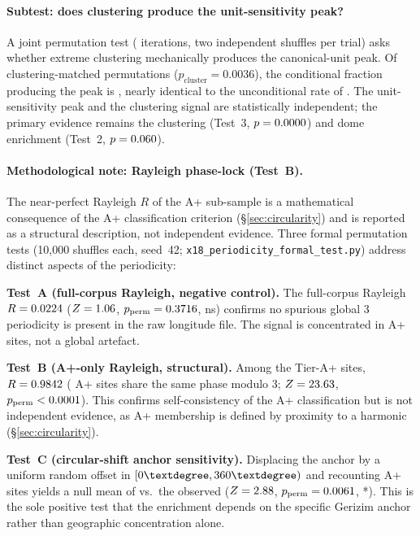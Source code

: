 \documentclass[HARVARD,twocolumn]{USG}
\begin{document}
\paragraph*{Subtest: does clustering produce the unit-sensitivity peak?}
\label{sec:cluster_cond_sensitivity}
A joint permutation test (\clusterCondN{} iterations, two independent shuffles
per trial) asks whether extreme clustering mechanically produces the
canonical-unit peak. Of \clusterCondClusterOk{} clustering-matched
permutations ($p_\mathrm{cluster} = 0.0036$), the conditional fraction
producing the peak is \clusterCondPeakFrac{}, nearly identical to the
unconditional rate of \clusterCondPeakFracUncond{}. The unit-sensitivity
peak and the clustering signal are statistically independent; the primary
evidence remains the clustering (Test~3, $p = 0.0000$) and dome
enrichment (Test~2, $p = 0.060$).

\paragraph*{Methodological note: Rayleigh phase-lock (Test~B).}
\label{sec:results_rayleigh}
The near-perfect Rayleigh $R$ of the A+ sub-sample is a mathematical
consequence of the A+ classification criterion (\S\ref{sec:circularity})
and is reported as a structural description, not independent evidence.
Three formal permutation tests (10{,}000 shuffles each, seed~42;
\texttt{x18\_periodicity\_formal\_test.py}) address distinct aspects of the
periodicity:

\textbf{Test~A (full-corpus Rayleigh, negative control).}
The full-corpus Rayleigh $R = 0.0224$
($Z = 1.06$, $p_\mathrm{perm} = 0.3716$, ns)
confirms no spurious global 3\textdegree{} periodicity is present in the
raw longitude file. The signal is concentrated in A+ sites, not a
global artefact.

\textbf{Test~B (A+-only Rayleigh, structural).}
Among the \Nap{} Tier-A+ sites, $R = 0.9842$
(\rayleighRPctPhrasing{} A+ sites share the same phase modulo
3\textdegree{}; $Z = 23.63$, $p_\mathrm{perm} < 0.0001$).
This confirms self-consistency of the A+ classification but is not
independent evidence, as A+ membership is defined by proximity to a
harmonic (\S\ref{sec:circularity}).

\textbf{Test~C (circular-shift anchor sensitivity).}
Displacing the anchor by a uniform random offset in $[0\textdegree,
360\textdegree)$ and recounting A+ sites yields a null mean of
\anchorShiftNullMu{} vs.\ the observed \anchorShiftApCount{}
($Z = 2.88$, $p_\mathrm{perm} = 0.0061$, *).
This is the sole positive test that the enrichment depends on the
specific Gerizim anchor rather than geographic concentration alone.
\end{document}

